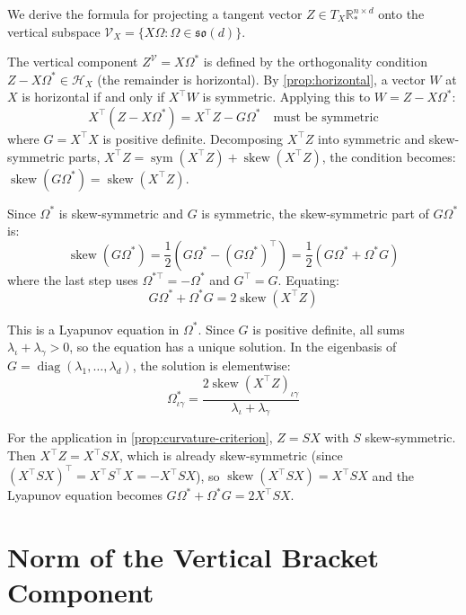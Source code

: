 \documentclass{article}
\newcommand{\RR}{\mathbb{R}}
\newcommand{\so}{\mathfrak{so}}
\DeclareMathOperator{\diag}{diag}
\DeclareMathOperator{\sym}{sym}
\DeclareMathOperator{\skewop}{skew}
\theoremstyle{plain}
\theoremstyle{definition}
\theoremstyle{remark}
\begin{document}
We derive the formula for projecting a tangent vector $Z \in T_X \RR_*^{n \times d}$ onto the vertical subspace $\mathcal{V}_X = \{X\Omega : \Omega \in \so(d)\}$.

The vertical component $Z^{\mathcal{V}} = X\Omega^*$ is defined by the orthogonality condition $Z - X\Omega^* \in \mathcal{H}_X$ (the remainder is horizontal).
By \cref{prop:horizontal}, a vector $W$ at $X$ is horizontal if and only if $X^\top W$ is symmetric.
Applying this to $W = Z - X\Omega^*$:
\begin{equation}
X^\top (Z - X\Omega^*) = X^\top Z - G\Omega^* \quad \text{must be symmetric}
\end{equation}
where $G = X^\top X$ is positive definite.
Decomposing $X^\top Z$ into symmetric and skew-symmetric parts, $X^\top Z = \sym(X^\top Z) + \skewop(X^\top Z)$, the condition becomes:
$\skewop(G\Omega^*) = \skewop(X^\top Z)$.

Since $\Omega^*$ is skew-symmetric and $G$ is symmetric, the skew-symmetric part of $G\Omega^*$ is:
\begin{equation}
\skewop(G\Omega^*) = \frac{1}{2} (G\Omega^* - (G\Omega^*)^\top) = \frac{1}{2} (G\Omega^* + \Omega^* G)
\end{equation}
where the last step uses $\Omega^{*\top} = -\Omega^*$ and $G^\top = G$.
Equating:
\begin{equation}
G\Omega^* + \Omega^* G = 2 \skewop(X^\top Z)
\end{equation}

This is a Lyapunov equation in $\Omega^*$.
Since $G$ is positive definite, all sums $\lambda_\iota + \lambda_\gamma > 0$, so the equation has a unique solution.
In the eigenbasis of $G = \diag(\lambda_1, \ldots, \lambda_d)$, the solution is elementwise:
\begin{equation}
\Omega^*_{\iota\gamma} = \frac{2 \skewop(X^\top Z)_{\iota\gamma}}{\lambda_\iota + \lambda_\gamma}
\end{equation}

For the application in \cref{prop:curvature-criterion}, $Z = SX$ with $S$ skew-symmetric.
Then $X^\top Z = X^\top S X$, which is already skew-symmetric (since $(X^\top S X)^\top = X^\top S^\top X = -X^\top S X$), so $\skewop(X^\top S X) = X^\top S X$ and the Lyapunov equation becomes $G\Omega^* + \Omega^* G = 2 X^\top S X$.


\section{Norm of the Vertical Bracket Component}\label{app:vertical-norm}
\end{document}
